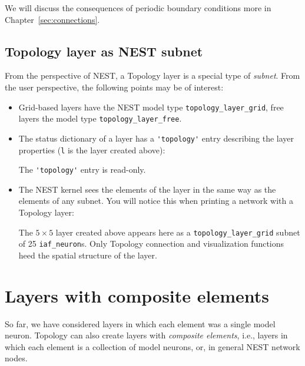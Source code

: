 \documentclass[a4paper,12pt]{report}
\begin{document}
We will discuss the consequences of periodic boundary conditions more
in Chapter~\ref{sec:connections}.

\subsection{Topology layer as NEST subnet}\label{sec:subnet}

From the perspective of NEST, a Topology layer is a special type of
\emph{subnet}. From the user perspective, the following
points may be of interest:
\begin{itemize}
\item Grid-based layers have the NEST model type
  \lstinline!topology_layer_grid!, free
  layers the model type
  \lstinline!topology_layer_free!.
\item The status dictionary of a layer has a \lstinline!'topology'!
  entry describing the layer properties (\lstinline!l! is the layer
  created above):
%


%
The \lstinline!'topology'! entry is read-only. 
\item The NEST kernel sees the elements of the layer in the same way
  as the elements of any subnet. You will notice this when printing a
  network with a Topology layer:
%


%
The $5\times 5$ layer created above appears here as a
\lstinline!topology_layer_grid! subnet of 25 \lstinline!iaf_neuron!s.
Only Topology connection and visualization functions heed the spatial
structure of the layer.
\end{itemize}

\section{Layers with composite elements}\label{sec:composite_layers}

So far, we have considered layers in which each element was a single
model neuron. Topology can also create layers with \emph{composite
  elements}, i.e., layers in which each
element is a collection of model neurons, or, in
general NEST network nodes.
\end{document}
